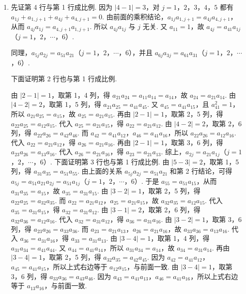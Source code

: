 \begin{solution}
\begin{enumerate}
\item 先证第 4 行与第 1 行成比例. 因为 \( \left| 4-1 \right|=3 \)，对 \(j=1\)，\(2\)，\(3\)，\(4\)，\(5\) 都有 \( a_{1j}+a_{1,j+1}+a_{4j}+a_{4,j+1}=0 \). 由前面的乘积结论，\( a_{1j}a_{1,j+1}=a_{4j}a_{4,j+1} \)，从而 \( a_{4j}a_{1j}=a_{4,j+1}a_{1,j+1} \). 所以 \( a_{4j}a_{1j} \) 与 \( j \) 无关. 又 \( a_{11}=1 \)，故 \( a_{4j}=a_{41}a_{1j} \)（\(j=1\)，\(2\)，\(\cdots\)，\(6\)）.

同理，\( a_{5j}a_{2j}=a_{51}a_{21} \)（\(j=1\)，\(2\)，\(\cdots\)，\(6\)），并且 \( a_{6j}a_{3j}=a_{61}a_{31} \)（\(j=1\)，\(2\)，\(\cdots\)，\(6\)）.

下面证明第 2 行也与第 1 行成比例.

由 \( \left| 2-1 \right|=1 \)，取第 1，4 列，得 \( a_{21}a_{24}=a_{11}a_{14}=a_{14} \)，故 \( a_{24}=a_{21}a_{14} \).
由 \( \left| 4-2 \right|=2 \)，取第 1，5 列，得 \( a_{21}a_{25}=a_{41}a_{45} \). 又 \( a_{45}=a_{41}a_{15} \)，且 \( a_{41}^2=1 \)，所以 \( a_{21}a_{25}=a_{15} \)，故 \( a_{25}=a_{21}a_{15} \).
再由 \( \left| 2-1 \right|=1 \)，取第 2，5 列，得 \( a_{22}a_{25}=a_{12}a_{15} \). 代入 \( a_{25}=a_{21}a_{15} \)，得 \( a_{22}=a_{21}a_{12} \).
由 \( \left| 4-2 \right|=2 \)，取第 2，6 列，得 \( a_{22}a_{26}=a_{42}a_{46} \). 而 \( a_{42}=a_{41}a_{12} \)，\( a_{46}=a_{41}a_{16} \)，所以 \( a_{22}a_{26}=a_{12}a_{16} \). 代入 \( a_{22}=a_{21}a_{12} \)，得 \( a_{26}=a_{21}a_{16} \).
再由 \( \left| 2-1 \right|=1 \)，取第 3，6 列，得 \( a_{23}a_{26}=a_{13}a_{16} \). 代入 \( a_{26}=a_{21}a_{16} \)，得 \( a_{23}=a_{21}a_{13} \).
综上，\( a_{2j}=a_{21}a_{1j} \)（\(j=1\)，\(2\)，\(\cdots\)，\(6\)）.
下面证明第 3 行也与第 1 行成比例.
由 \( \left| 5-3 \right|=2 \)，取第 1，5 列，得 \( a_{31}a_{35}=a_{51}a_{55} \). 由上面的关系 \( a_{5j}a_{2j}=a_{51}a_{21} \) 和第 2 行结论，可得 \( a_{5j}=a_{51}a_{21}a_{2j}=a_{51}a_{1j} \)（\(j=1\)，\(2\)，\(\cdots\)，\(6\)）. 于是 \( a_{55}=a_{51}a_{15} \)，从而 \( a_{31}a_{35}=a_{15} \)，故 \( a_{35}=a_{31}a_{15} \).
由 \( \left| 3-2 \right|=1 \)，取第 2，5 列，得 \( a_{22}a_{25}=a_{32}a_{35} \). 而 \( a_{22}=a_{21}a_{12} \)，\( a_{25}=a_{21}a_{15} \)，故 \( a_{32}a_{35}=a_{12}a_{15} \). 代入 \( a_{35}=a_{31}a_{15} \)，得 \( a_{32}=a_{31}a_{12} \).
由 \( \left| 3-1 \right|=2 \)，取第 2，6 列，得 \( a_{32}a_{36}=a_{12}a_{16} \). 代入 \( a_{32}=a_{31}a_{12} \)，得 \( a_{36}=a_{31}a_{16} \).
由 \( \left| 3-2 \right|=1 \)，取第 3，6 列，得 \( a_{23}a_{26}=a_{33}a_{36} \). 而 \( a_{23}=a_{21}a_{13} \)，\( a_{26}=a_{21}a_{16} \)，故 \( a_{33}a_{36}=a_{13}a_{16} \). 代入 \( a_{36}=a_{31}a_{16} \)，得 \( a_{33}=a_{31}a_{13} \).
由 \( \left| 3-4 \right|=1 \)，取第 1，4 列，得 \( a_{31}a_{34}=a_{41}a_{44} \). 又 \( a_{44}=a_{41}a_{14} \)，所以 \( a_{31}a_{34}=a_{14} \)，故 \( a_{34}=a_{31}a_{14} \).
再由 \( \left| 3-4 \right|=1 \)，取第 2，5 列，得 \( a_{32}a_{35}=a_{42}a_{45} \).
因为 \( a_{42}=a_{41}a_{12} \)，\( a_{45}=a_{41}a_{15} \)，所以上式右边等于 \( a_{12}a_{15} \)，与前面一致.
由 \( \left| 3-4 \right|=1 \)，取第 3，6 列，得 \( a_{33}a_{36}=a_{43}a_{46} \).
因为 \( a_{43}=a_{41}a_{13} \)，\( a_{46}=a_{41}a_{16} \)，所以上式右边等于 \( a_{13}a_{16} \)，与前面一致.


\end{enumerate}
\end{solution}

